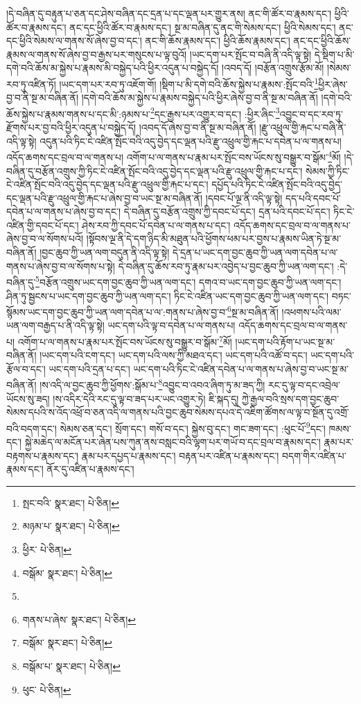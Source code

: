 །དེ་བཞིན་དུ་བརྟུན་པ་ཅན་དང་ཤེས་བཞིན་དང་དྲན་པ་དང་ལྡན་པར་གྱུར་ནས། ནང་གི་ཚོར་བ་རྣམས་དང་། ཕྱིའི་ཚོར་བ་རྣམས་དང་། ནང་དང་ཕྱིའི་ཚོར་བ་རྣམས་དང་། སྔ་མ་བཞིན་དུ་ནང་གི་སེམས་དང་། ཕྱིའི་སེམས་དང་། ནང་དང་ཕྱིའི་སེམས་ལ་གནས་སོ་ཞེས་བྱ་བ་དང་། ནང་གི་ཆོས་རྣམས་དང་། ཕྱིའི་ཆོས་རྣམས་དང་། ནང་དང་ཕྱིའི་ཆོས་རྣམས་ལ་གནས་སོ་ཞེས་བྱ་བ་རྒྱས་པར་གསུངས་པ་ལྟ་བུའོ། །ཡང་དག་པར་སྤོང་བ་བཞི་ནི་འདི་ལྟ་སྟེ། དེ་སྡིག་པ་མི་དགེ་བའི་ཆོས་མ་སྐྱེས་པ་རྣམས་མི་བསྐྱེད་པའི་ཕྱིར་འདུན་པ་བསྐྱེད་དོ། །འབད་དོ། །བརྩོན་འགྲུས་རྩོམ་མོ། །སེམས་རབ་ཏུ་འཛིན་ཏོ། །ཡང་དག་པར་རབ་ཏུ་འཇོག་གོ། །སྡིག་པ་མི་དགེ་བའི་ཆོས་སྐྱེས་པ་རྣམས་:སྤོང་བའི་\footnote{སྤང་བའི་  སྣར་ཐང་།  པེ་ཅིན། }ཕྱིར་ཞེས་བྱ་བ་ནི་སྔ་མ་བཞིན་ནོ། །དགེ་བའི་ཆོས་མ་སྐྱེས་པ་རྣམས་བསྐྱེད་པའི་ཕྱིར་ཞེས་བྱ་བ་ནི་སྔ་མ་བཞིན་ནོ། །དགེ་བའི་ཆོས་སྐྱེས་པ་རྣམས་གནས་པ་དང་མི་:ཉམས་པ་\footnote{མཉམ་པ་  སྣར་ཐང་།  པེ་ཅིན། }དང་རྒྱས་པར་འགྱུར་བ་དང་། :ཕྱིར་ཞིང་\footnote{ཕྱིར་  པེ་ཅིན། }འབྱུང་བ་དང་རབ་ཏུ་རྫོགས་པར་བྱ་བའི་ཕྱིར་འདུན་པ་བསྐྱེད་དོ། །འབད་དོ་ཞེས་བྱ་བ་ནི་སྔ་མ་བཞིན་ནོ། །རྫུ་འཕྲུལ་གྱི་རྐང་པ་བཞི་ནི་འདི་ལྟ་སྟེ། འདུན་པའི་ཏིང་ངེ་འཛིན་སྤོང་བའི་འདུ་བྱེད་དང་ལྡན་པའི་རྫུ་འཕྲུལ་གྱི་རྐང་པ་དབེན་པ་ལ་གནས་པ། འདོད་ཆགས་དང་བྲལ་བ་ལ་གནས་པ། འགོག་པ་ལ་གནས་པ་རྣམ་པར་སྤོང་བས་ཡོངས་སུ་བསྒྱུར་བ་སྒོམ་\footnote{བསྒོམ་  སྣར་ཐང་།  པེ་ཅིན། }མོ། །དེ་བཞིན་དུ་བརྩོན་འགྲུས་ཀྱི་ཏིང་ངེ་འཛིན་སྤོང་བའི་འདུ་བྱེད་དང་ལྡན་པའི་རྫུ་འཕྲུལ་གྱི་རྐང་པ་དང་། སེམས་ཀྱི་ཏིང་ངེ་འཛིན་སྤོང་བའི་འདུ་བྱེད་དང་ལྡན་པའི་རྫུ་འཕྲུལ་གྱི་རྐང་པ་དང་། དཔྱོད་པའི་ཏིང་ངེ་འཛིན་སྤོང་བའི་འདུ་བྱེད་དང་ལྡན་པའི་རྫུ་འཕྲུལ་གྱི་རྐང་པ་ཞེས་བྱ་བ་ཡང་སྔ་མ་བཞིན་ནོ། །དབང་པོ་ལྔ་ནི་འདི་ལྟ་སྟེ། དད་པའི་དབང་པོ་དབེན་པ་ལ་གནས་པ་ཞེས་བྱ་བ་དང་། དེ་བཞིན་དུ་བརྩོན་འགྲུས་ཀྱི་དབང་པོ་དང་། དྲན་པའི་དབང་པོ་དང་། ཏིང་ངེ་འཛིན་གྱི་དབང་པོ་དང་། ཤེས་རབ་ཀྱི་དབང་པོ་དབེན་པ་ལ་གནས་པ་དང་། འདོད་ཆགས་དང་བྲལ་བ་ལ་གནས་པ་ཞེས་བྱ་བ་ལ་སོགས་པའོ། །སྟོབས་ལྔ་ནི་དེ་དག་ཉིད་མི་མཐུན་པའི་ཕྱོགས་ཕམ་པར་བྱས་པ་རྣམས་ཡིན་ཏེ་སྔ་མ་བཞིན་ནོ། །བྱང་ཆུབ་ཀྱི་ཡན་ལག་བདུན་ནི་འདི་ལྟ་སྟེ། དེ་དྲན་པ་ཡང་དག་བྱང་ཆུབ་ཀྱི་ཡན་ལག་དབེན་པ་ལ་གནས་པ་ཞེས་བྱ་བ་ལ་སོགས་པ་སྟེ། དེ་བཞིན་དུ་ཆོས་རབ་ཏུ་རྣམ་པར་འབྱེད་པ་བྱང་ཆུབ་ཀྱི་ཡན་ལག་དང་། :དེ་བཞིན་དུ་\footnote{}བརྩོན་འགྲུས་ཡང་དག་བྱང་ཆུབ་ཀྱི་ཡན་ལག་དང་། དགའ་བ་ཡང་དག་བྱང་ཆུབ་ཀྱི་ཡན་ལག་དང་། ཤིན་ཏུ་སྦྱངས་པ་ཡང་དག་བྱང་ཆུབ་ཀྱི་ཡན་ལག་དང་། ཏིང་ངེ་འཛིན་ཡང་དག་བྱང་ཆུབ་ཀྱི་ཡན་ལག་དང་། བཏང་སྙོམས་ཡང་དག་བྱང་ཆུབ་ཀྱི་ཡན་ལག་དབེན་པ་ལ་:གནས་པ་ཞེས་བྱ་བ་\footnote{གནས་པ་ཞེས་  སྣར་ཐང་།  པེ་ཅིན། }སྔ་མ་བཞིན་ནོ། །འཕགས་པའི་ལམ་ཡན་ལག་བརྒྱད་པ་ནི་འདི་ལྟ་སྟེ། ཡང་དག་པའི་ལྟ་བ་དབེན་པ་ལ་གནས་པ། འདོད་ཆགས་དང་བྲལ་བ་ལ་གནས་པ། འགོག་པ་ལ་གནས་པ་རྣམ་པར་སྤོང་བས་ཡོངས་སུ་བསྒྱུར་བ་སྒོམ་\footnote{བསྒོམ་  སྣར་ཐང་།  པེ་ཅིན། }མོ། །ཡང་དག་པའི་རྟོག་པ་ཡང་སྔ་མ་བཞིན་ནོ། །ཡང་དག་པའི་ངག་དང་། ཡང་དག་པའི་ལས་ཀྱི་མཐའ་དང་། ཡང་དག་པའི་འཚོ་བ་དང་། ཡང་དག་པའི་རྩོལ་བ་དང་། ཡང་དག་པའི་དྲན་པ་དང་། ཡང་དག་པའི་ཏིང་ངེ་འཛིན་དབེན་པ་ལ་གནས་པ་ཞེས་བྱ་བ་ཡང་སྔ་མ་བཞིན་ནོ། །ས་འདི་ལ་བྱང་ཆུབ་ཀྱི་ཕྱོགས་:སྒོམ་པ་\footnote{བསྒོམ་པ་  སྣར་ཐང་།  པེ་ཅིན། }འབྱུང་བ་འབའ་ཞིག་ཏུ་མ་ཟད་ཀྱི། རང་དུ་ལྟ་བ་དང་འབྲེལ་ཡོངས་སུ་ཟད། །ས་འདིར་དེའི་རང་དུ་ལྟ་བ་ཟད་པར་ཡང་འགྱུར་ཏེ། ཇི་སྐད་དུ། ཀྱེ་རྒྱལ་བའི་སྲས་དག་བྱང་ཆུབ་སེམས་དཔའི་ས་འོད་འཕྲོ་བ་ཅན་འདི་ལ་གནས་པའི་བྱང་ཆུབ་སེམས་དཔའ་དེ་འཇིག་ཚོགས་ལ་ལྟ་བ་སྔོན་དུ་འགྲོ་བའི་བདག་དང་། སེམས་ཅན་དང་། སྲོག་དང་། གསོ་བ་དང་། སྐྱེས་བུ་དང་། གང་ཟག་དང་། :ཕུང་པོ་\footnote{ཕུང་  པེ་ཅིན། }དང་། ཁམས་དང་། སྐྱེ་མཆེད་ལ་མངོན་པར་ཞེན་པས་ཀུན་ནས་བསླང་བའི་ལྷག་པར་གཡོ་བ་དང་བྲལ་བ་རྣམས་དང་། རྣམ་པར་བརྟགས་པ་རྣམས་དང་། རྣམ་པར་དཔྱད་པ་རྣམས་དང་། བརྟན་པར་འཛིན་པ་རྣམས་དང་། བདག་གིར་འཛིན་པ་རྣམས་དང་། ནོར་དུ་འཛིན་པ་རྣམས་དང་། 